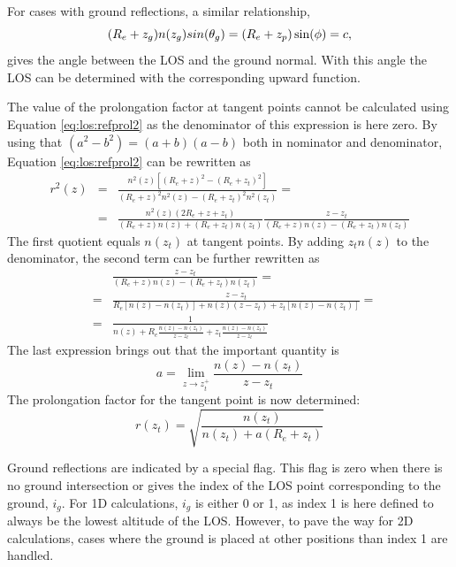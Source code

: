  For cases with ground reflections, a similar relationship,
  \begin{equation}
    (R_e+z_g)n(z_g)sin(\theta_g) = (R_e+z_p)\sin(\phi) = c,
  \end{equation}
  gives the angle between the LOS and the ground normal. With this angle
  the LOS can be determined with the corresponding upward function.
  
  The value of the prolongation factor at tangent points cannot be
  calculated using Equation \ref{eq:los:refprol2} as the denominator
  of this expression is here zero. By using that
  $(a^2-b^2)=(a+b)(a-b)$ both in nominator and denominator, Equation
  \ref{eq:los:refprol2} can be rewritten as
  \begin{eqnarray}
    r^2(z) &=& \frac{n^2(z) \left[(R_e+z)^2-(R_e+z_t)^2\right]}
                   {(R_e+z)^2n^2(z)-(R_e+z_t)^2n^2(z_t)} = \nonumber \\
   &=&  \frac{n^2(z)\left(2R_e+z+z_t\right)}{(R_e+z)n(z)+(R_e+z_t)n(z_t)}
        \frac{z-z_t}{(R_e+z)n(z)-(R_e+z_t)n(z_t)} \nonumber
  \end{eqnarray}
  The first quotient equals $n(z_t)$ at tangent points. By adding $z_tn(z)$
  to the denominator, the second term can be
  further rewritten as
  \begin{eqnarray}
     & & \frac{z-z_t}{(R_e+z)n(z)-(R_e+z_t)n(z_t)}= \nonumber \\
     &=& \frac{z-z_t}{R_e[n(z)-n(z_t)]+n(z)(z-z_t)+z_t[n(z)-n(z_t)]}= 
                                                                 \nonumber \\
     &=& \frac{1}{n(z)+R_e\frac{n(z)-n(z_t)}{z-z_t}+
                     z_t\frac{n(z)-n(z_t)}{z-z_t}}               \nonumber
  \end{eqnarray}
  The last expression brings out that the important quantity is 
  \begin{equation}
    a = \lim_{z \to z_t^+}\frac{n(z)-n(z_t)}{z-z_t}
  \end{equation}
  The prolongation factor for the tangent point is now determined:
  \begin{equation}
    r(z_t) = \sqrt{\frac{n(z_t)}{n(z_t)+a(R_e+z_t)}}
  \end{equation}

  
  
  \label{sec:los:ground}
  
  Ground reflections are indicated by a special flag. This flag is
  zero when there is no ground intersection or gives the index of the
  LOS point corresponding to the ground, $i_g$. For 1D calculations,
  $i_g$ is either 0 or 1, as index 1 is here defined to always be the
  lowest altitude of the LOS. However, to pave the way for 2D
  calculations, cases where the ground is placed at other positions
  than index 1 are handled.
  
